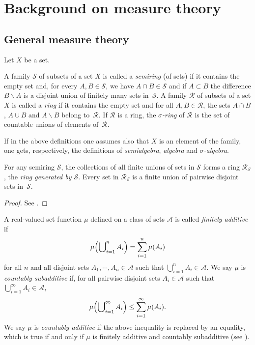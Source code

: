 \section{Background on measure theory}
\label{sec:measure-thy}

\subsection{General measure theory}
Let $X$ be a set.

\begin{definition}
  A family $\mathcal{S}$ of subsets of a set $X$ is called a
  \emph{semiring} (of sets) if it contains the empty set and, for
  every $A,B \in \mathcal{S}$, we have
  $A \cap B \in \mathcal{S}$ and if $A \subset B$ the difference
  $B \backslash A$ is a disjoint union of finitely many sets
  in~$\mathcal{S}$. A family $\mathcal{R}$ of subsets of a set $X$ is
  called a \emph{ring} if it contains the empty set and for all
  $A,B \in \mathcal{R}$, the sets $A \cap B$, $A \cup B$ and
  $A \backslash B$ belong to~$\mathcal{R}$. If $\mathcal{R}$ is a
  ring, the \emph{$\sigma$-ring} of $\mathcal{R}$ is the set of
  countable unions of elements of~$\mathcal{R}$.
\end{definition}

\begin{definition}
  If in the above definitions one assumes also that $X$ is an element of
  the family, one gets, respectively, the definitions of
  \emph{semialgebra}, \emph{algebra} and \emph{$\sigma$-algebra}.
\end{definition}

\begin{lemma}
  For any semiring $\mathcal{S}$, the collections of all finite unions
  of sets in $\mathcal{S}$ forms a ring $\mathcal{R}_{\mathcal{S}}$,
  the \emph{ring generated by $\mathcal{S}$}. Every set in
  $\mathcal{R}_{\mathcal{S}}$ is a finite union of pairwise disjoint
  sets in~$\mathcal{S}$.
\end{lemma}
\begin{proof}
See \cite[1.2.14~Lemma]{Bo07:MeasureTheory}.
\end{proof}

\begin{definition}
A real-valued set function $\mu$ defined on a class of sets $\mathcal{A}$ is called \emph{finitely additive} if 
\[
\mu\Bigl(\bigcup\nolimits_{i=1}^n A_i \Bigr) = \sum_{i=1}^n \mu(A_i)
\]
for all $n$ and all disjoint sets $A_1,\cdots,A_n \in \mathcal{A}$ such that $\bigcup_{i=1}^n A_i \in \mathcal{A}$.
We say $\mu$ is \emph{countably subadditive} if, for all pairwise
disjoint sets $A_i \in \mathcal{A}$ such that $\bigcup_{i=1}^{\infty}
A_i \in \mathcal{A}$,
\[
\mu\Bigl(\bigcup\nolimits_{i=1}^{\infty} A_i \Bigr) \leq \sum_{i=1}^{\infty} \mu(A_i).
\]
We say $\mu$ is \emph{countably additive} if the above inequality is
replaced by an equality, which is true if and only if $\mu$ is
finitely additive and countably subadditive (see
\cite[1.3.9~Proposition]{Bo07:MeasureTheory}).
\end{definition}

